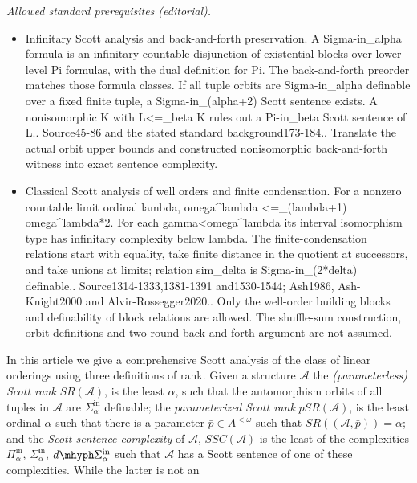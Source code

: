 \documentclass[10pt,a4paper]{amsart}
\providecommand{\A}{\mathcal{A}}
\providecommand{\Pinf}[1]{\Pi^{\mathrm{in}}_{#1}}
\providecommand{\Sinf}[1]{\Sigma^{\mathrm{in}}_{#1}}
\providecommand{\dSinf}[1]{d\mhyph\Sigma^{\mathrm{in}}_{#1}}
\providecommand{\bp}{\bar p}
\newcommand{\SR}{SR}
\newcommand{\pSR}{pSR}
\begin{document}
\noindent\textit{Allowed standard prerequisites (editorial).}\begin{itemize}
\item Infinitary Scott analysis and back-and-forth preservation. A Sigma-in\_alpha formula is an infinitary countable disjunction of existential blocks over lower-level Pi formulas, with the dual definition for Pi. The back-and-forth preorder matches those formula classes. If all tuple orbits are Sigma-in\_alpha definable over a fixed finite tuple, a Sigma-in\_(alpha+2) Scott sentence exists. A nonisomorphic K with L<=\_beta K rules out a Pi-in\_beta Scott sentence of L.. Source45-86 and the stated standard background173-184.. Translate the actual orbit upper bounds and constructed nonisomorphic back-and-forth witness into exact sentence complexity.
\item Classical Scott analysis of well orders and finite condensation. For a nonzero countable limit ordinal lambda, omega\textasciicircum{}lambda <=\_(lambda+1) omega\textasciicircum{}lambda*2. For each gamma<omega\textasciicircum{}lambda its interval isomorphism type has infinitary complexity below lambda. The finite-condensation relations start with equality, take finite distance in the quotient at successors, and take unions at limits; relation sim\_delta is Sigma-in\_(2*delta) definable.. Source1314-1333,1381-1391 and1530-1544; Ash1986, Ash-Knight2000 and Alvir-Rossegger2020.. Only the well-order building blocks and definability of block relations are allowed. The shuffle-sum construction, orbit definitions and two-round back-and-forth argument are not assumed.
\end{itemize}\medskip
In this article we give a comprehensive Scott analysis of the class of linear
orderings using three definitions of rank. Given a structure $\A$ the
\emph{(parameterless) Scott rank} $\SR(\A)$, is the least $\alpha$, such that
the automorphism orbits of all tuples in $\A$ are $\Sinf{\alpha}$ definable; the
\emph{parameterized Scott rank} $\pSR(\A)$, is the least ordinal $\alpha$ such
that there is a parameter $\bp\in A^{<\omega}$ such that $SR((\A,\bp))=\alpha$;
and the \emph{Scott sentence complexity} of $\A$, $SSC(\A)$ is the least of the
complexities $\Pinf{\alpha}$, $\Sinf{\alpha}$, $\dSinf{\alpha}$ such that $\A$
has a Scott sentence of one of these complexities. While the latter is not an
\end{document}
